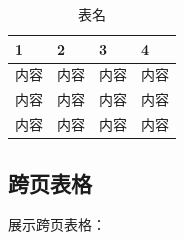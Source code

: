 \documentclass[a4paper,AutoFakeBold={2.7},UTF8,zihao=5,twoside]{ctexart} %
\numberwithin{equation}{section}%
\theoremstyle{definition}%
\begin{document}
\begin{table}[htbp]%
    \caption{表名}\label{表名}
    \centering
    \begin{tabular}{p{3cm}<{\centering} p{3cm}<{\centering} p{3cm}<{\centering} p{3cm}<{\centering}}
        \toprule[1.5pt]
        1  & 2  & 3  & 4  \\
        \midrule[0.75pt]
        内容 & 内容 & 内容 & 内容 \\
        内容 & 内容 & 内容 & 内容 \\
        内容 & 内容 & 内容 & 内容 \\
        \bottomrule[1pt]
    \end{tabular}
\end{table}

\subsection{跨页表格}
展示跨页表格：
\end{document}
